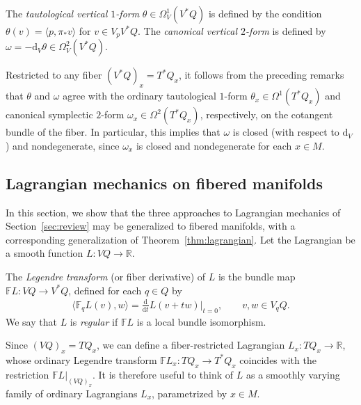 \documentclass[pdftex]{sigma}
\numberwithin{equation}{section}
\begin{document}
\begin{Definition} The \emph{tautological vertical $1$-form} $ \theta \in \Omega ^1 _V ( V ^\ast Q ) $ is def\/ined by the condition $ \theta ( v ) = \langle p , \pi _\ast v \rangle $ for $ v \in V _p V ^\ast Q $. The \emph{canonical vertical $2$-form} is def\/ined by $ \omega = - \mathrm{d} _V \theta \in \Omega ^2 _V ( V ^\ast Q ) $.
\end{Definition}

\begin{Remark} Restricted to any f\/iber $ ( V ^\ast Q ) _x = T ^\ast Q _x $, it follows from the preceding remarks that $\theta$ and $\omega$ agree with the ordinary tautological $1$-form $\theta _x \in \Omega ^1 ( T ^\ast Q _x ) $ and canonical symplectic $2$-form $\omega _x \in \Omega ^2 ( T ^\ast Q _x ) $, respectively, on the cotangent bundle of the f\/iber. In particular, this implies that $ \omega $ is closed (with respect to $ \mathrm{d} _V $) and nondegenerate, since $ \omega _x $ is closed and nondegenerate for each $ x \in M $.
\end{Remark}

\subsection{Lagrangian mechanics on f\/ibered manifolds}

In this section, we show that the three approaches to Lagrangian mechanics of Section~\ref{sec:review} may be generalized to f\/ibered manifolds, with a corresponding generalization of Theorem~\ref{thm:lagrangian}. Let the Lagrangian be a smooth function $ L \colon V Q \rightarrow \mathbb{R} $.

\begin{Definition} The \emph{Legendre transform} (or f\/iber derivative) of $L$ is the bundle map $ \mathbb{F} L \colon V Q \rightarrow V ^\ast Q $,
 def\/ined for each $ q \in Q $ by
 \begin{gather*}
 \bigl\langle \mathbb{F} _q L (v) , w \bigr\rangle = \frac{\mathrm{d}}{\mathrm{d}t} L ( v + t w ) \Bigr\rvert _{ t = 0 }, \qquad v, w \in V _q Q .
 \end{gather*}
We say that $L$ is \emph{regular} if $ \mathbb{F} L $ is a local bundle isomorphism.
\end{Definition}

\begin{Remark} Since $ ( V Q ) _x = T Q _x $, we can def\/ine a f\/iber-restricted Lagrangian $ L _x \colon T Q _x \rightarrow \mathbb{R} $, whose ordinary Legendre transform $ \mathbb{F} L _x \colon T Q _x \rightarrow T ^\ast Q _x $ coincides with the restriction $ \mathbb{F} L \rvert _{ (V Q) _x } $. It is therefore useful to think of $L$ as a smoothly varying family of ordinary Lagrangians $ L _x $, parametrized by $ x \in M $.
\end{Remark}
\end{document}
